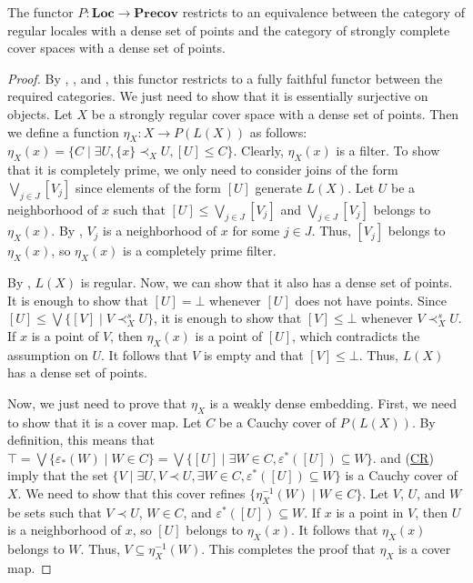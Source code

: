 \documentclass[reqno]{amsart}
\newcommand{\axref}[1]{(\hyperref[ax:#1]{#1})}
\theoremstyle{definition}
\theoremstyle{remark}
\numberwithin{figure}{section}
\newcommand{\rb}{\prec}
\newcommand{\cat}[1]{\mathbf{#1}}
\begin{document}
\begin{thm}
The functor $P : \cat{Loc} \to \cat{Precov}$ restricts to an equivalence between the category of regular locales with a dense set of points and the category of strongly complete cover spaces with a dense set of points.
\end{thm}
\begin{proof}
By , , and , this functor restricts to a fully faithful functor between the required categories.
We just need to show that it is essentially surjective on objects.
Let $X$ be a strongly regular cover space with a dense set of points.
Then we define a function $\eta_X : X \to P(L(X))$ as follows: $\eta_X(x) = \{ C \mid \exists U, \{ x \} \rb_X U, [U] \leq C \}$.
Clearly, $\eta_X(x)$ is a filter.
To show that it is completely prime, we only need to consider joins of the form $\bigvee_{j \in J} [V_j]$ since elements of the form $[U]$ generate $L(X)$.
Let $U$ be a neighborhood of $x$ such that $[U] \leq \bigvee_{j \in J} [V_j]$ and $\bigvee_{j \in J} [V_j]$ belongs to $\eta_X(x)$.
By , $V_j$ is a neighborhood of $x$ for some $j \in J$.
Thus, $[V_j]$ belongs to $\eta_X(x)$, so $\eta_X(x)$ is a completely prime filter.

By , $L(X)$ is regular.
Now, we can show that it also has a dense set of points.
It is enough to show that $[U] = \bot$ whenever $[U]$ does not have points.
Since $[U] \leq \bigvee \{ [V] \mid V \rb^s_X U \}$, it is enough to show that $[V] \leq \bot$ whenever $V \rb^s_X U$.
If $x$ is a point of $V$, then $\eta_X(x)$ is a point of $[U]$, which contradicts the assumption on $U$.
It follows that $V$ is empty and that $[V] \leq \bot$.
Thus, $L(X)$ has a dense set of points.

Now, we just need to prove that $\eta_X$ is a weakly dense embedding.
First, we need to show that it is a cover map.
Let $C$ be a Cauchy cover of $P(L(X))$.
By definition, this means that $\top = \bigvee \{ \varepsilon_*(W) \mid W \in C \} = \bigvee \{ [U] \mid \exists W \in C, \varepsilon^*([U]) \subseteq W \}$.
 and \axref{CR} imply that the set $\{ V \mid \exists U, V \rb U, \exists W \in C, \varepsilon^*([U]) \subseteq W \}$ is a Cauchy cover of $X$.
We need to show that this cover refines $\{ \eta_X^{-1}(W) \mid W \in C \}$.
Let $V$, $U$, and $W$ be sets such that $V \rb U$, $W \in C$, and $\varepsilon^*([U]) \subseteq W$.
If $x$ is a point in $V$, then $U$ is a neighborhood of $x$, so $[U]$ belongs to $\eta_X(x)$.
It follows that $\eta_X(x)$ belongs to $W$.
Thus, $V \subseteq \eta_X^{-1}(W)$.
This completes the proof that $\eta_X$ is a cover map.


\end{proof}
\end{document}
